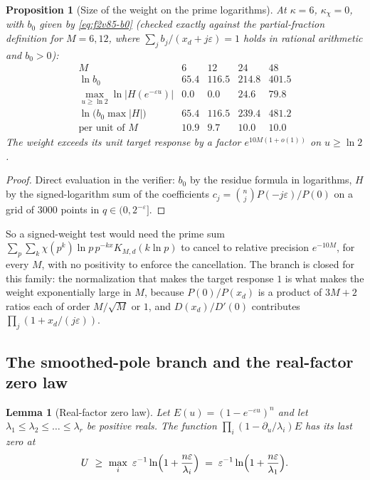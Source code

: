 \documentclass[11pt]{article}
\newtheorem{proposition}[theorem]{Proposition}
\newtheorem{lemma}[theorem]{Lemma}
\theoremstyle{definition}
\theoremstyle{remark}
\begin{document}
\begin{proposition}[Size of the weight on the prime logarithms]
\label{prop:f2v85-size}
At \(\kappa=6\), \(\kappa_\chi=0\), with \(b_0\) given by
\eqref{eq:f2v85-b0} (checked exactly against the partial-fraction
definition for \(M=6,12\), where \(\sum_jb_j/(x_d+j\varepsilon)=1\)
holds in rational arithmetic and \(b_0>0\)):
\begin{equation}
\begin{array}{c|cccc}
 M & 6 & 12 & 24 & 48\\ \hline
 \ln b_0 & 65.4 & 116.5 & 214.8 & 401.5\\
 \max_{u\ge\ln2}\ln|H(e^{-\varepsilon u})| & 0.0 & 0.0 & 24.6 & 79.8\\
 \ln\bigl(b_0\max|H|\bigr) & 65.4 & 116.5 & 239.4 & 481.2\\
 \text{per unit of }M & 10.9 & 9.7 & 10.0 & 10.0
\end{array}
\label{eq:f2v85-size}
\end{equation}
The weight exceeds its unit target response by a factor \(e^{10M(1+o(1))}\)
on \(u\ge\ln2\).
\end{proposition}

\begin{proof}
Direct evaluation in the verifier: \(b_0\) by the residue formula in
logarithms, \(H\) by the signed-logarithm sum of the coefficients
\(c_j=\binom njP(-j\varepsilon)/P(0)\) on a grid of \(3000\) points in
\(q\in(0,2^{-\varepsilon}]\).
\end{proof}

So a signed-weight test would need the prime sum
\(\sum_p\sum_k\chi(p^k)\ln p\,p^{-kx}K_{M,d}(k\ln p)\) to cancel to
relative precision \(e^{-10M}\), for every \(M\), with no positivity to
enforce the cancellation.  The branch is closed for this family:
the normalization that makes the target response \(1\) is what makes
the weight exponentially large in \(M\), because
\(P(0)/P(x_d)\) is a product of \(3M+2\) ratios each of order
\(M/\sqrt M\) or \(1\), and \(D(x_d)/D'(0)\) contributes
\(\prod_j(1+x_d/(j\varepsilon))\).

\subsection{The smoothed-pole branch and the real-factor zero law}

\begin{lemma}[Real-factor zero law]
\label{lem:f2v85-zero-law}
Let \(E(u)=(1-e^{-\varepsilon u})^n\) and let
\(\lambda_1\le\lambda_2\le\dots\le\lambda_r\) be positive reals.  The
function \(\prod_i(1-\partial_u/\lambda_i)E\) has its last zero at
\begin{equation}
 U\ \ge\ \max_i\ \varepsilon^{-1}\ln\Bigl(1+\frac{n\varepsilon}{\lambda_i}\Bigr)
 \;=\;\varepsilon^{-1}\ln\Bigl(1+\frac{n\varepsilon}{\lambda_1}\Bigr).
\label{eq:f2v85-law}
\end{equation}
\end{lemma}
\end{document}
